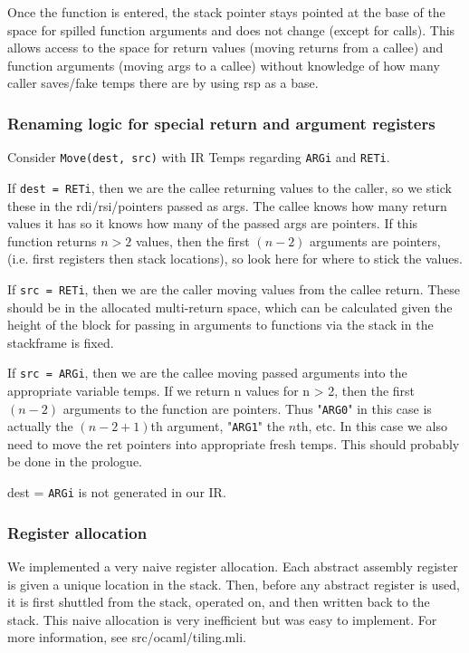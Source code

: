 \documentclass{hw}
\begin{document}
Once the function is entered, the stack pointer stays pointed at the base of the
space for spilled function arguments and does not change (except for calls).
This allows access to the space for return values (moving returns from a callee)
and function arguments (moving args to a callee) without knowledge of how many caller
saves/fake temps there are by using rsp as a base.

\subsubsection{Renaming logic for special return and argument registers}
Consider \texttt{Move(dest, src)} with IR Temps regarding \texttt{ARGi} and \texttt{RETi}.

If \texttt{dest = RETi}, then we are the callee returning values to the caller,
so we stick these in the rdi/rsi/pointers passed as args. The callee
knows how many return values it has so it knows how many of the passed
args are pointers. If this function returns $n > 2$ values, then the
first $(n-2)$ arguments are pointers, (i.e. first registers then stack
locations), so look here for where to stick the values.

If \texttt{src = RETi}, then we are the caller moving values from the callee
return. These should be in the allocated multi-return space, which can
be calculated given the height of the block for passing in arguments
to functions via the stack in the stackframe is fixed.

If \texttt{src = ARGi}, then we are the callee moving passed arguments into
the appropriate variable temps. If we return n values for n > 2, then
the first $(n-2)$ arguments to the function are pointers. Thus "\texttt{ARG0}"
in this case is actually the $(n-2+1)$th argument, "\texttt{ARG1}" the $n$th, etc. 
In this case we also need to move the ret pointers into appropriate
fresh temps. This should probably be done in the prologue.

dest = \texttt{ARGi} is not generated in our IR. 

\subsubsection{Register allocation}
We implemented a very naive register allocation. Each abstract assembly register
is given a unique location in the stack. Then, before any abstract register is used,
it is first shuttled from the stack, operated on, and then written back to the stack.
This naive allocation is very inefficient but was easy to implement. For more information,
see src/ocaml/tiling.mli.
\end{document}
